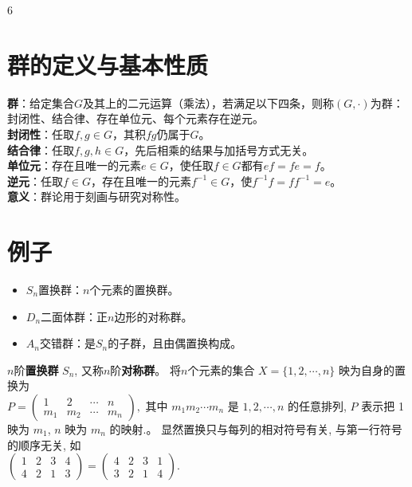 \documentclass[landscape]{article}
\renewcommand{\normalsize}{\fontsize{5pt}{8pt}\selectfont}
\begin{document}
\normalsize

\begin{multicols*}{6}

\section*{群的定义与基本性质}
\textbf{群}：给定集合$G$及其上的二元运算（乘法），若满足以下四条，则称$(G,\cdot)$为群：封闭性、结合律、存在单位元、每个元素存在逆元。\\
\textbf{封闭性}：任取$f,g\in G$，其积$fg$仍属于$G$。\\
\textbf{结合律}：任取$f,g,h\in G$，先后相乘的结果与加括号方式无关。\\
\textbf{单位元}：存在且唯一的元素$e\in G$，使任取$f\in G$都有$ef=fe=f$。\\
\textbf{逆元}：任取$f\in G$，存在且唯一的元素$f^{-1}\in G$，使$f^{-1}f=ff^{-1}=e$。\\
\textbf{意义}：群论用于刻画与研究对称性。

\section*{例子}
\begin{itemize}
  \item $S_n$置换群：$n$个元素的置换群。
  \item $D_n$二面体群：正$n$边形的对称群。
  \item $A_n$交错群：是$S_n$的子群，且由偶置换构成。
\end{itemize}
$n$阶\textbf{置换群} $S_n$, 又称$n$阶\textbf{对称群}。
将$n$个元素的集合 $X=\{1, 2, \cdots, n\}$ 映为自身的置换为
\\
$
P = \begin{pmatrix} 
1 & 2 & \cdots & n \\ 
m_1 & m_2 & \cdots & m_n 
\end{pmatrix},
$
其中 $m_1 m_2 \cdots m_n$ 是 $1, 2, \cdots, n$ 的任意排列, 
$P$ 表示把 1 映为 $m_1$, $n$ 映为 $m_n$ 的映射.。
显然置换只与每列的相对符号有关, 与第一行符号的顺序无关, 如
\\
$
\begin{pmatrix} 
1 & 2 & 3 & 4 \\ 
4 & 2 & 1 & 3 
\end{pmatrix} 
= 
\begin{pmatrix} 
4 & 2 & 3 & 1 \\ 
3 & 2 & 1 & 4 
\end{pmatrix}.
$


\end{multicols*}
\end{document}
